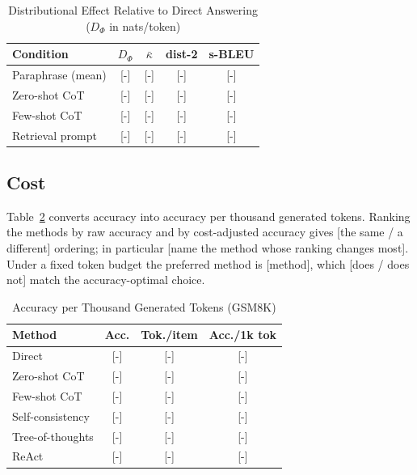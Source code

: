 \documentclass[conference]{IEEEtran}
\begin{document}
\begin{table}[htbp]
\caption{Distributional Effect Relative to Direct Answering ($D_{\Phi}$ in nats/token)}
\centering
\small
\begin{tabular}{lcccc}
\toprule
\textbf{Condition} & \textbf{$D_{\Phi}$} & \textbf{$\bar{\kappa}$} & \textbf{dist-2} & \textbf{s-BLEU} \\
\midrule
Paraphrase (mean) & \textcolor{BrickRed}{[-]} & \textcolor{BrickRed}{[-]} & \textcolor{BrickRed}{[-]} & \textcolor{BrickRed}{[-]} \\
Zero-shot CoT & \textcolor{BrickRed}{[-]} & \textcolor{BrickRed}{[-]} & \textcolor{BrickRed}{[-]} & \textcolor{BrickRed}{[-]} \\
Few-shot CoT & \textcolor{BrickRed}{[-]} & \textcolor{BrickRed}{[-]} & \textcolor{BrickRed}{[-]} & \textcolor{BrickRed}{[-]} \\
Retrieval prompt & \textcolor{BrickRed}{[-]} & \textcolor{BrickRed}{[-]} & \textcolor{BrickRed}{[-]} & \textcolor{BrickRed}{[-]} \\
\bottomrule
\end{tabular}
\label{tab:distributional}
\end{table}

\subsection{Cost}
\label{sec:cost-results}

Table~\ref{tab:cost} converts accuracy into accuracy per thousand generated tokens. Ranking the methods by raw accuracy and by cost-adjusted accuracy gives \textcolor{BrickRed}{[the same / a different]} ordering; in particular \textcolor{BrickRed}{[name the method whose ranking changes most]}. Under a fixed token budget the preferred method is \textcolor{BrickRed}{[method]}, which \textcolor{BrickRed}{[does / does not]} match the accuracy-optimal choice.

\begin{table}[htbp]
\caption{Accuracy per Thousand Generated Tokens (GSM8K)}
\centering
\small
\begin{tabular}{lccc}
\toprule
\textbf{Method} & \textbf{Acc.} & \textbf{Tok./item} & \textbf{Acc./1k tok} \\
\midrule
Direct & \textcolor{BrickRed}{[-]} & \textcolor{BrickRed}{[-]} & \textcolor{BrickRed}{[-]} \\
Zero-shot CoT & \textcolor{BrickRed}{[-]} & \textcolor{BrickRed}{[-]} & \textcolor{BrickRed}{[-]} \\
Few-shot CoT & \textcolor{BrickRed}{[-]} & \textcolor{BrickRed}{[-]} & \textcolor{BrickRed}{[-]} \\
Self-consistency & \textcolor{BrickRed}{[-]} & \textcolor{BrickRed}{[-]} & \textcolor{BrickRed}{[-]} \\
Tree-of-thoughts & \textcolor{BrickRed}{[-]} & \textcolor{BrickRed}{[-]} & \textcolor{BrickRed}{[-]} \\
ReAct & \textcolor{BrickRed}{[-]} & \textcolor{BrickRed}{[-]} & \textcolor{BrickRed}{[-]} \\
\bottomrule
\end{tabular}
\label{tab:cost}
\end{table}
\end{document}
